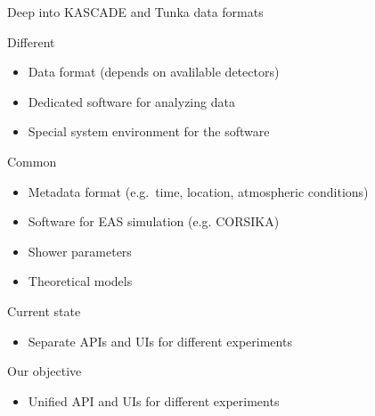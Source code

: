 \documentclass[18pt]{beamer}
\begin{document}
\begin{frame}{Deep into KASCADE and Tunka data formats}
\vspace{-2em}
\begin{minipage}[t]{0.48\textwidth}
  \begin{block}{Different}
    \begin{itemize}
      \item Data format (depends on avalilable detectors)
      \item Dedicated software for analyzing data
      \item Special system environment for the software
    \end{itemize}
  \end{block}
\end{minipage}
\hfill
\begin{minipage}[t]{0.48\textwidth}
  \begin{block}{Common}
    \begin{itemize}
      \item Metadata format (e.g.\ time, location, atmospheric conditions)
      \item Software for EAS simulation (e.g. CORSIKA)
      \item Shower parameters
      \item Theoretical models
    \end{itemize}
  \end{block}
\end{minipage}


\begin{minipage}[t]{0.48\textwidth}
  \begin{exampleblock}{Current state}
    \begin{itemize}
      \item Separate APIs and UIs for different experiments
    \end{itemize}
  \end{exampleblock}
\end{minipage}
\hfill
\begin{minipage}[t]{0.48\textwidth}
  \begin{exampleblock}{Our objective}
    \begin{itemize}
      \item Unified API and UIs for different experiments
    \end{itemize}
  \end{exampleblock}
\end{minipage}
\end{frame}
\end{document}

